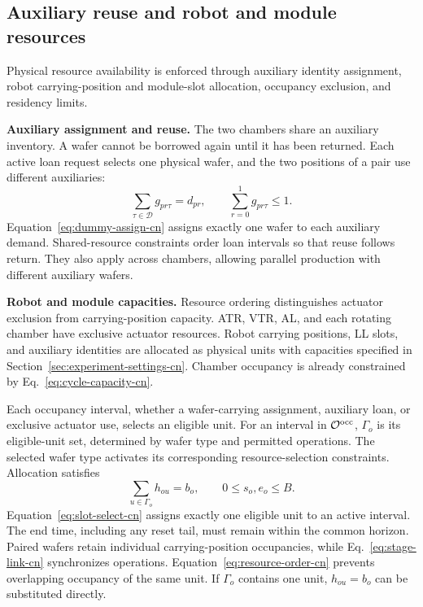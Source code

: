 \documentclass[final,5p,times,twocolumn]{elsarticle}
\begin{document}
\subsection{Auxiliary reuse and robot and module resources}
\label{sec:model-resource-cn}
Physical resource availability is enforced through auxiliary identity assignment, robot carrying-position and module-slot allocation, occupancy exclusion, and residency limits.

\noindent\textbf{Auxiliary assignment and reuse.}
The two chambers share an auxiliary inventory. A wafer cannot be borrowed again until it has been returned. Each active loan request selects one physical wafer, and the two positions of a pair use different auxiliaries:
\begin{equation}
\sum_{\tau\in\mathcal D}g_{pr\tau}=d_{pr},\qquad
\sum_{r=0}^{1}g_{pr\tau}\le1.
\label{eq:dummy-assign-cn}
\end{equation}
Equation~\eqref{eq:dummy-assign-cn} assigns exactly one wafer to each auxiliary demand. Shared-resource constraints order loan intervals so that reuse follows return. They also apply across chambers, allowing parallel production with different auxiliary wafers.

\noindent\textbf{Robot and module capacities.}
Resource ordering distinguishes actuator exclusion from carrying-position capacity. ATR, VTR, AL, and each rotating chamber have exclusive actuator resources. Robot carrying positions, LL slots, and auxiliary identities are allocated as physical units with capacities specified in Section~\ref{sec:experiment-settings-cn}. Chamber occupancy is already constrained by Eq.~\eqref{eq:cycle-capacity-cn}.

Each occupancy interval, whether a wafer-carrying assignment, auxiliary loan, or exclusive actuator use, selects an eligible unit. For an interval in $\mathcal O^{\rm occ}$, $\Gamma_o$ is its eligible-unit set, determined by wafer type and permitted operations. The selected wafer type activates its corresponding resource-selection constraints. Allocation satisfies
\begin{equation}
\sum_{u\in\Gamma_o}h_{ou}=b_o,\qquad 0\le s_o,e_o\le B.
\label{eq:slot-select-cn}
\end{equation}
Equation~\eqref{eq:slot-select-cn} assigns exactly one eligible unit to an active interval. The end time, including any reset tail, must remain within the common horizon. Paired wafers retain individual carrying-position occupancies, while Eq.~\eqref{eq:stage-link-cn} synchronizes operations. Equation~\eqref{eq:resource-order-cn} prevents overlapping occupancy of the same unit. If $\Gamma_o$ contains one unit, $h_{ou}=b_o$ can be substituted directly.
\end{document}

